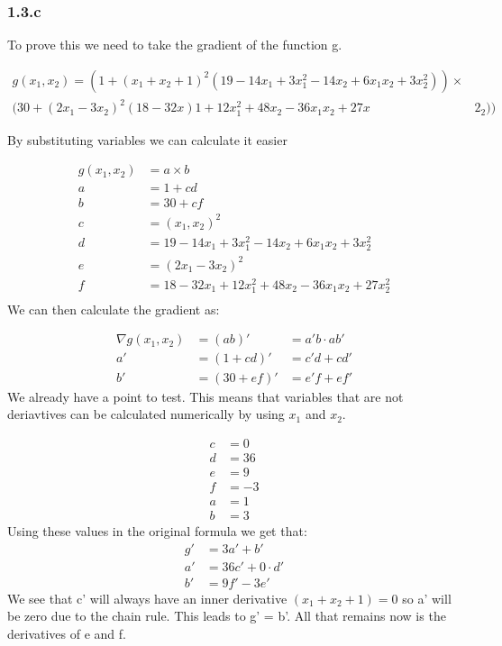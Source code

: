 \documentclass{article}
\begin{document}
\subsubsection*{1.3.c}
To prove this we need to take the gradient of the function g.

\begin{align*}
  g (x_1 ,x_2) = ( 1 + ( x_1 + x_2 + 1)^2 (19 - 14 x_1 + 3 x^2_1 - 14 x_2 + 6 x_1 x_2 + 3 x^2_2) ) \times \\
  ( 30 + (2 x_1 - 3 x_2)^2 (18 - 32 x)1 + 12 x^2_1 + 48 x_2 - 36 x_1 x_2 + 27 x&2_2) )
\end{align*}

By substituting variables we can calculate it easier

\begin{align*}
  g(x_1, x_2) &= a \times b\\
  a &= 1 + cd\\
  b &= 30 + cf\\
  c &= (x_1, x_2)^2\\
  d &=19-14x_1+3x_1^2-14x_2+6x_1x_2+3x_2^2\\
  e &=(2x_1-3x_2)^2\\
  f &=18-32x_1+12x_1^2+48x_2-36x_1x_2+27x_2^2\\
\end{align*}
We can then calculate the gradient as:

\begin{align*}
  \nabla g(x_1, x_2) &= (ab)' &= a'b \cdot ab'\\
  a'&=(1+cd)'&=c'd+cd'\\
  b'&=(30+ef)'&=e'f+ef'
\end{align*}
We already have a point to test. This means that variables that are not
deriavtives can be calculated numerically by using $x_1$ and $x_2$.

\begin{align*}
c&=0\\
d&=36\\
e&=9\\
f&=-3\\
a&=1\\
b&=3
\end{align*}
Using these values in the original formula we get that:
\begin{align*}
g'&=3a'+b'\\
a'&=36c'+0\cdot d'\\
b'&=9f'-3e'
\end{align*}
We see that c' will always have an inner derivative $(x_1 + x_2 + 1) = 0$ so a'
will be zero due to the chain rule. This leads to g' = b'. All that remains now is the derivatives of e and f.
\end{document}
